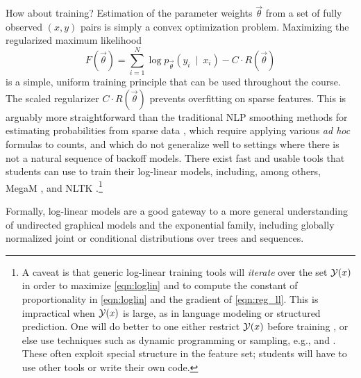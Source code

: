 \documentclass[11pt,letterpaper]{article}
\DeclareMathOperator*{\argmax}{arg\,max}
\newcommand{\Note}[1]{}
\renewcommand{\Note}[1]{\hl{[#1]}}
\newcommand{\NoteSigned}[3]{{\sethlcolor{#2}\Note{#1: #3}}}
\newcommand{\NoteFF}[1]{\NoteSigned{FF}{LightBlue}{#1}}
\newcommand{\NoteJE}[1]{\NoteSigned{JE}{LightGreen}{#1}}
\begin{document}
How about training?  Estimation of the parameter weights
$\vec{\theta}$ from a set of fully observed $(x,y)$ pairs is simply a
convex optimization problem.  Maximizing the regularized maximum
likelihood
\begin{equation}\label{eqn:reg_ll}
  F\left(\vec{\theta}\right) = \sum_{i=1}^N \log{p_{\vec{\theta}}\left(y_i\ \mid\ x_i\right)} - C \cdot R\left(\vec{\theta}\right)
\end{equation}
is a simple, uniform training principle that can be used throughout
the course.  The scaled regularizer $C\cdot R(\vec{\theta})$
prevents overfitting on sparse features.
This is arguably more straightforward than the traditional NLP
smoothing methods for estimating probabilities from sparse data
\cite{chen-goodman-1996}, which require applying various {\em ad hoc}
formulas to counts, and which do not generalize well to settings where
there is not a natural sequence of backoff models.  There exist 
fast and usable tools that students can use to train their log-linear
models, including, among others, MegaM \cite{daume04cg-bfgs}, 
and NLTK \cite{bird2009natural}.\footnote{\label{fn:bigY}A caveat is that generic
  log-linear training tools will {\em iterate} over the set ${\cal
    Y}(x)$ in order to maximize
  \eqref{eqn:loglin} and to compute the constant of proportionality
  in \eqref{eqn:loglin} and the gradient of
  \eqref{eqn:reg_ll}.  This is impractical when ${\cal Y}(x)$ is large, as in
  language modeling or structured prediction.  One will do better to
 one either restrict ${\cal Y}(x)$ before training
\cite{johnson-et-al-1999}, or else use techniques such as dynamic
programming or sampling, e.g., 
\cite{lafferty-mccallum-pereira-2001} and \cite{rosenfeld-chen-zhu-2001}. 
These often exploit special
structure in the feature set; students will have to use other tools or 
write their own code.}
%


Formally, log-linear models are a good gateway to a more general
understanding of undirected graphical models and the exponential
family, including globally normalized joint or conditional
distributions over trees and sequences.
\end{document}
